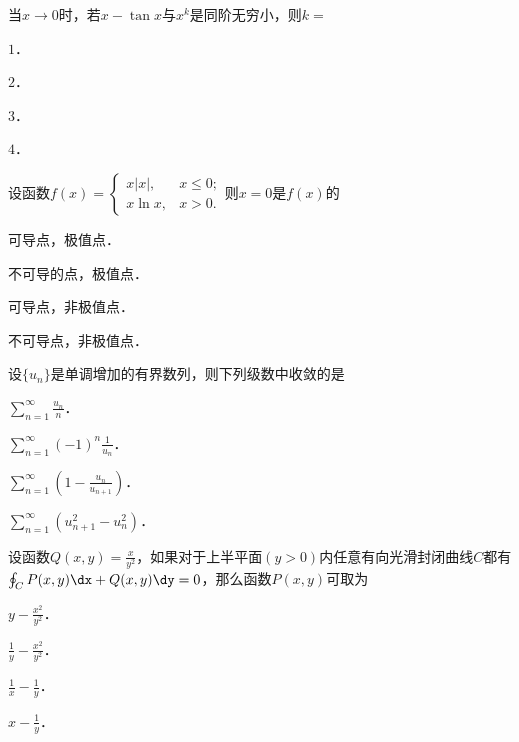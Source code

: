 \documentclass[plain,noanswer,medmath]{../../template/jnuexam}
\begin{document}




\begin{problem}
当$x \to 0$时，若$x - \tan x$与$x^k$是同阶无穷小，则$k =$\pickout{}
\begin{abcd}
\item $1$．
\item $2$．
\item $3$．
\item $4$．
\end{abcd}
\end{problem}


\begin{problem}
设函数$f(x) = \begin{cases}
    x|x|, & x \le 0; \\
  x\ln x, & x > 0.
\end{cases}$则$x = 0$是$f(x)$的\pickout{}
\begin{abcd}
\item 可导点，极值点．
\item 不可导的点，极值点．
\item 可导点，非极值点．
\item 不可导点，非极值点．
\end{abcd}
\end{problem}


\begin{problem}
设$\{u_n\}$是单调增加的有界数列，则下列级数中收敛的是\pickout{}
\begin{abcd}
\item $\sum_{n = 1}^{\infty}\frac{u_n}{n}$．
\item $\sum_{n = 1}^{\infty}(- 1)^n\frac{1}{u_n}$．
\item $\sum_{n = 1}^{\infty}\left(1 - \frac{u_n}{u_{n + 1}} \right)$．
\item $\sum_{n = 1}^{\infty}(u_{n + 1}^2 - u_n^2)$．
\end{abcd}
\end{problem}


\begin{problem}
设函数$Q(x,y) = \frac{x}{y^2}$，如果对于上半平面$(y > 0)$内任意有向光滑封闭曲线$C$都有
$\oint_C P(x,y)\dx + Q(x,y)\dy = 0$，那么函数$P(x,y)$可取为\pickout{}
\begin{abcd}
\item $y - \frac{x^2}{y^2}$．
\item $\frac{1}{y} - \frac{x^2}{y^2}$．
\item $\frac{1}{x} - \frac{1}{y}$．
\item $x - \frac{1}{y}$．
\end{abcd}
\end{problem}
\end{document}
